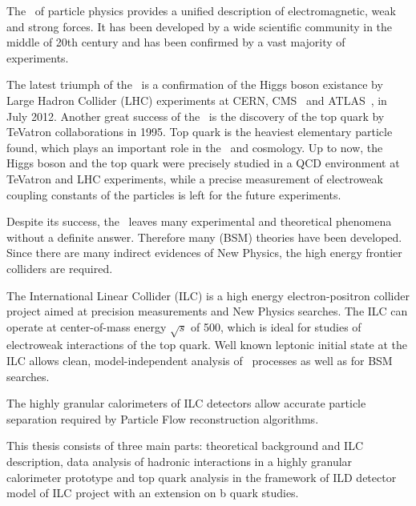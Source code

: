 
The \sm\ of particle physics provides a unified description of electromagnetic, weak and strong forces. It has been developed by a wide scientific community in the middle of 20th century and has been confirmed by a vast majority of experiments. 

The latest triumph of the \sm\ is a confirmation of the Higgs boson existance by Large Hadron Collider (LHC) experiments at CERN, CMS~\cite{bib:HiggsCms} and ATLAS~\cite{bib:HiggsAtlas}, in July 2012.
Another great success of the \sm\ is the discovery of the top quark by TeVatron collaborations in 1995. Top quark is the heaviest elementary particle found, which plays an important role in the \sm\ and cosmology. 
Up to now, the Higgs boson and the top quark were precisely studied in a QCD environment at TeVatron and LHC experiments, while a precise measurement of electroweak coupling constants of the particles is left for the future experiments.

Despite its success, the \sm\ leaves many experimental and theoretical phenomena without a definite answer. Therefore many \bsm (BSM) theories have been developed. 
Since there are many indirect evidences of New Physics, the high energy frontier colliders are required. 

The International Linear Collider \cite{bib:ILC} (ILC) is a high energy electron-positron collider project aimed at precision measurements and New Physics searches. 
The ILC can operate at center-of-mass energy $\sqrt{s}$ of 500\gev, which is ideal for studies of electroweak interactions of the top quark. 
Well known leptonic initial state at the ILC allows clean, model-independent analysis of \sm\ processes as well as for BSM searches. 

The highly granular calorimeters of ILC detectors allow accurate particle separation required by Particle Flow reconstruction algorithms.

This thesis consists of three main parts: theoretical background and ILC description, data analysis of hadronic interactions in a highly granular calorimeter prototype and top quark analysis in the framework of ILD detector model of ILC project with an extension on b quark studies.

